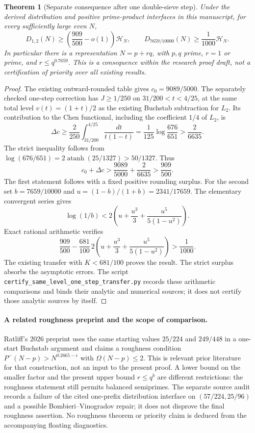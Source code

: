 \documentclass[11pt]{article}
\newtheorem{theorem}{Theorem}
\newcommand{\HN}{\mathcal H_N}
\begin{document}
\begin{theorem}[Separate consequence after one double-sieve step]
\label{thm:same-level-one-step-chen}
Under the derived distribution and positive prime-product interfaces
in this manuscript, for every sufficiently large even $N$,
\[
 D_{1,2}(N)\ge\left(\frac{909}{500}-o(1)\right)\HN,
 \qquad
 D_{7659/10000}(N)\ge\frac1{1000}\HN.
\]
In particular there is a representation $N=p+rq$, with $p,q$ prime,
$r=1$ or prime, and $r\le q^{0.7659}$. This is a consequence within
the research proof draft, not a certification of priority over all
existing results.
\end{theorem}

\begin{proof}
The existing outward-rounded table gives $c_0=9089/5000$.
The separately checked one-step correction has $J\ge1/250$ on
$31/200<t<4/25$, at the same total level $v(t)=(1+t)/2$ as the
existing Buchstab subtraction for $L_2$. Its contribution to the
Chen functional, including the coefficient $1/4$ of $L_2$, is
\[
 \Delta c\ge\frac{2}{250}\int_{31/200}^{4/25}
                  \frac{dt}{t(1-t)}
 =\frac{1}{125}\log\frac{676}{651}
 >\frac{2}{6635}.
\]
The strict inequality follows from
$\log(676/651)=2\operatorname{atanh}(25/1327)>50/1327$.
Thus
\[
 c_0+\Delta c>
 \frac{9089}{5000}+\frac{2}{6635}>
 \frac{909}{500}.
\]
The first statement follows with a fixed positive rounding surplus.
For the second set $b=7659/10000$ and
$u=(1-b)/(1+b)=2341/17659$. The elementary convergent series gives
\[
 \log(1/b)
 <2\left(u+\frac{u^3}{3}+\frac{u^5}{5(1-u^2)}\right).
\]
Exact rational arithmetic verifies
\[
 \frac{909}{500}
 -\frac{681}{100}\,2\left(u+\frac{u^3}{3}
                      +\frac{u^5}{5(1-u^2)}\right)
 >\frac1{1000}.
\]
The existing transfer with $K<681/100$ proves the result. The
strict surplus absorbs the asymptotic errors. The script
\texttt{certify\_same\_level\_one\_step\_transfer.py} records these
arithmetic comparisons and binds their analytic and numerical sources;
it does not certify those analytic sources by itself.
\end{proof}


\paragraph{A related roughness preprint and the scope of comparison.}
Ratliff's 2026 preprint \cite{Ratliff2026} uses the same starting
values $25/224$ and $249/448$ in a one-start Buchstab argument and
claims a roughness condition $P^-(N-p)>N^{0.2665-\epsilon}$ with
$\Omega(N-p)\le2$. This is relevant prior literature for that
construction, not an input to the present proof. A lower bound on
the smaller factor and the present upper bound $r\le q^b$ are
different restrictions: the roughness statement still permits
balanced semiprimes. The separate source audit records a failure of
the cited one-prefix distribution interface on
$(57/224,25/96)$ and a possible Bombieri--Vinogradov repair; it does
not disprove the final roughness assertion. No roughness theorem or
priority claim is deduced from the accompanying floating diagnostics.
\end{document}
